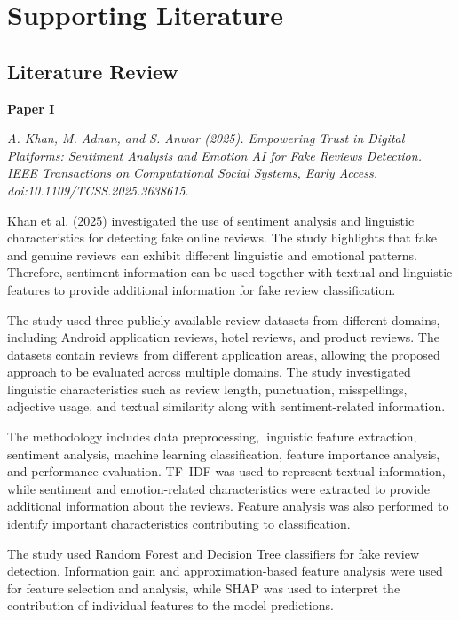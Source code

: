 \documentclass[12pt,a4paper]{report}
\begin{document}
\newpage
\chapter{Supporting Literature}

\section{Literature Review}


\textbf{Paper I}

\textit{A. Khan, M. Adnan, and S. Anwar (2025). Empowering Trust in Digital Platforms: Sentiment Analysis and Emotion AI for Fake Reviews Detection. IEEE Transactions on Computational Social Systems, Early Access. doi:10.1109/TCSS.2025.3638615.}

Khan et al. (2025) investigated the use of sentiment analysis and linguistic characteristics for detecting fake online reviews. The study highlights that fake and genuine reviews can exhibit different linguistic and emotional patterns. Therefore, sentiment information can be used together with textual and linguistic features to provide additional information for fake review classification.

The study used three publicly available review datasets from different domains, including Android application reviews, hotel reviews, and product reviews. The datasets contain reviews from different application areas, allowing the proposed approach to be evaluated across multiple domains. The study investigated linguistic characteristics such as review length, punctuation, misspellings, adjective usage, and textual similarity along with sentiment-related information.

The methodology includes data preprocessing, linguistic feature extraction, sentiment analysis, machine learning classification, feature importance analysis, and performance evaluation. TF--IDF was used to represent textual information, while sentiment and emotion-related characteristics were extracted to provide additional information about the reviews. Feature analysis was also performed to identify important characteristics contributing to classification.

The study used Random Forest and Decision Tree classifiers for fake review detection. Information gain and approximation-based feature analysis were used for feature selection and analysis, while SHAP was used to interpret the contribution of individual features to the model predictions.
\end{document}

